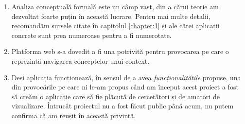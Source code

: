 \documentclass[12pt, a4paper, twoside, romanian]{teza-upb}
\begin{document}
    \begin{enumerate}
        \item Analiza conceptuală formală este un câmp vast, din a cărui teorie am dezvoltat foarte puțin în această lucrare. Pentru mai multe detalii, recomandăm sursele citate în capitolul \ref{chapter:1} și ale cărei aplicații concrete sunt prea numeroase pentru a fi numerotate.
          \item Platforma web s-a dovedit a fi una potrivită pentru provocarea pe care o reprezintă navigarea conceptelor unui context.
          \item Deși aplicația funcționează, în sensul de a avea \textit{funcționalitățile} propuse, una din provocările pe care ni le-am propus când am început acest proiect a fost să creăm o aplicație care să fie plăcută de cercetători și de amatori de vizualizare. Întrucât proiectul nu a fost făcut public până acum, nu putem confirma că am reușit în această privință.
    \end{enumerate}
\end{document}
